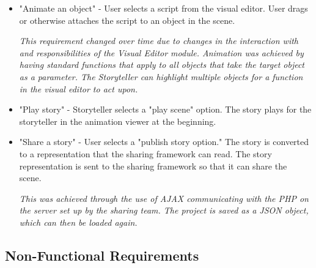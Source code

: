 \documentclass[12pt]{article}
\begin{document}
\begin{itemize}
\item "Animate an object" -  User selects a script from the visual editor. User drags or otherwise attaches the script to an object in the scene.\

\textit{This requirement changed over time due to changes in the interaction with and responsibilities of the Visual Editor module. Animation was achieved by having standard functions that apply to all objects that take the target object as a parameter. The Storyteller can highlight multiple objects for a function in the visual editor to act upon.}

\item "Play story" - Storyteller selects a "play scene" option. The story plays for the storyteller in the animation viewer at the beginning.\

\item "Share a story" - User selects a "publish story option." The story is converted to a representation that the sharing framework can read. The story representation is sent to the sharing framework so that it can share the scene.\

\textit{This was achieved through the use of AJAX communicating with the PHP on the server set up by the sharing team. The project is saved as a JSON object, which can then be loaded again.}

\end{itemize}


\subsection{Non-Functional Requirements}
\end{document}
